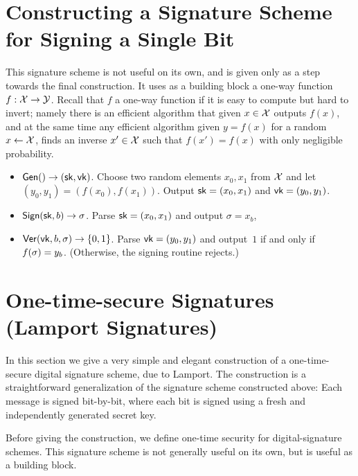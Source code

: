 \section{Constructing a Signature Scheme for Signing a Single Bit}

This signature scheme is not useful on its own, and is given only as a step towards the final construction.  It uses as a building block a one-way function $f:\mathcal{X}\rightarrow\mathcal{Y}$.  Recall that $f$ a one-way function if it is easy to compute but hard to invert; namely there is an efficient algorithm that given $x\in\mathcal{X}$ outputs $f(x)$, and at the same time any efficient algorithm given $y=f(x)$ for a random $x\leftarrow \cal X$, finds an inverse $x'\in\mathcal{X}$ such that $f(x')=f(x)$ with only negligible probability.  

\begin{itemize}
  \item $\mathsf{Gen}() \to ({\mathsf{sk}}, \mathsf{vk})$. 
    Choose two random elements $x_0, x_1$ from $\mathcal{X}$ and let $(y_0,y_1)=(f(x_0),f(x_1))$.  Output ${\mathsf{sk}}=(x_0,x_1)$ and $\mathsf{vk}=(y_0,y_1)$.
    
	\item $\mathsf{Sign}({\mathsf{sk}}, b) \to \sigma$.  Parse ${\mathsf{sk}}=(x_0,x_1)$ and output $\sigma=x_b$, 
	\item $\mathsf{Ver}(\mathsf{vk}, b, \sigma) \to \{0,1\}$. Parse $\mathsf{vk}=(y_0,y_1)$ and output~$1$ if and only if $f(\sigma)=y_b$. 
    (Otherwise, the signing routine rejects.)
\end{itemize}


\section{One-time-secure Signatures (Lamport Signatures)} \label{sec:lamport}

In this section we give a very simple and elegant construction 
of a one-time-secure digital signature scheme, due to Lamport.\cite{L79}
The construction is a straightforward generalization of  the signature scheme constructed above:  Each message is signed bit-by-bit, where each bit is signed using a fresh and independently generated secret key. 


Before giving the construction, we define one-time security for 
digital-signature schemes.
This signature scheme is not generally useful on its own, but is
useful as a building block.

